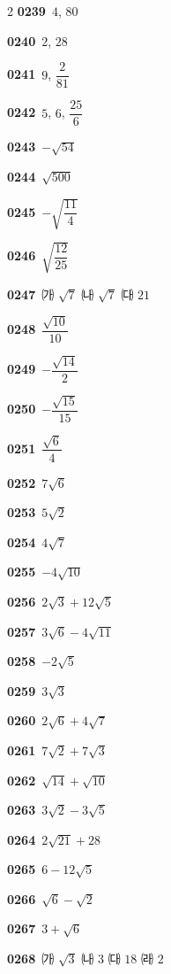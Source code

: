 \documentclass[10pt,a4paper]{article}
\begin{document}
\begin{multicols}{2}
\noindent\textbf{0239}\ $4$, $80$\par
\noindent\textbf{0240}\ $2$, $28$\par
\noindent\textbf{0241}\ $9$, $\dfrac{2}{81}$\par
\noindent\textbf{0242}\ $5$, $6$, $\dfrac{25}{6}$\par
\noindent\textbf{0243}\ $-\sqrt{54}$\par
\noindent\textbf{0244}\ $\sqrt{500}$\par
\noindent\textbf{0245}\ $-\sqrt{\dfrac{11}{4}}$\par
\noindent\textbf{0246}\ $\sqrt{\dfrac{12}{25}}$\par
\noindent\textbf{0247}\ ㈎ $\sqrt{7}$ ㈏ $\sqrt{7}$ ㈐ $21$\par
\noindent\textbf{0248}\ $\dfrac{\sqrt{10}}{10}$\par
\noindent\textbf{0249}\ $-\dfrac{\sqrt{14}}{2}$\par
\noindent\textbf{0250}\ $-\dfrac{\sqrt{15}}{15}$\par
\noindent\textbf{0251}\ $\dfrac{\sqrt{6}}{4}$\par
\noindent\textbf{0252}\ $7\sqrt{6}$\par
\noindent\textbf{0253}\ $5\sqrt{2}$\par
\noindent\textbf{0254}\ $4\sqrt{7}$\par
\noindent\textbf{0255}\ $-4\sqrt{10}$\par
\noindent\textbf{0256}\ $2\sqrt{3}+12\sqrt{5}$\par
\noindent\textbf{0257}\ $3\sqrt{6}-4\sqrt{11}$\par
\noindent\textbf{0258}\ $-2\sqrt{5}$\par
\noindent\textbf{0259}\ $3\sqrt{3}$\par
\noindent\textbf{0260}\ $2\sqrt{6}+4\sqrt{7}$\par
\noindent\textbf{0261}\ $7\sqrt{2}+7\sqrt{3}$\par
\noindent\textbf{0262}\ $\sqrt{14}+\sqrt{10}$\par
\noindent\textbf{0263}\ $3\sqrt{2}-3\sqrt{5}$\par
\noindent\textbf{0264}\ $2\sqrt{21}+28$\par
\noindent\textbf{0265}\ $6-12\sqrt{5}$\par
\noindent\textbf{0266}\ $\sqrt{6}-\sqrt{2}$\par
\noindent\textbf{0267}\ $3+\sqrt{6}$\par
\noindent\textbf{0268}\ ㈎ $\sqrt{3}$ ㈏ $3$ ㈐ $18$ ㈑ $2$\par

\end{multicols}
\end{document}
